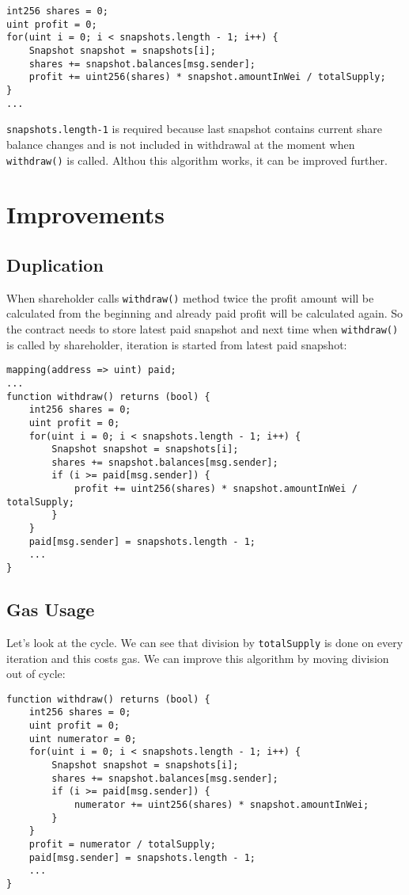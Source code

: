 \documentclass[onecolumn]{article}
\begin{document}
\begin{lstlisting}
int256 shares = 0;
uint profit = 0;
for(uint i = 0; i < snapshots.length - 1; i++) {
	Snapshot snapshot = snapshots[i];
	shares += snapshot.balances[msg.sender];
	profit += uint256(shares) * snapshot.amountInWei / totalSupply;
}
...
\end{lstlisting}
\lstinline{snapshots.length-1} is required because last snapshot contains current share balance changes and is not included in withdrawal at the moment when \lstinline{withdraw()} is called.
Althou this algorithm works, it can be improved further.

\section{Improvements}
\subsection{Duplication}
When shareholder calls \lstinline{withdraw()} method twice the profit amount will be calculated from the beginning and already paid profit will be calculated again. So the contract needs to store latest paid snapshot and next time when \lstinline{withdraw()} is called by shareholder, iteration is started from latest paid snapshot:
\begin{lstlisting}
mapping(address => uint) paid;
...
function withdraw() returns (bool) {
	int256 shares = 0;
	uint profit = 0;
	for(uint i = 0; i < snapshots.length - 1; i++) {
		Snapshot snapshot = snapshots[i];
		shares += snapshot.balances[msg.sender];
		if (i >= paid[msg.sender]) {
			profit += uint256(shares) * snapshot.amountInWei / totalSupply;
		}
	}
	paid[msg.sender] = snapshots.length - 1;
	...
}
\end{lstlisting}
\subsection{Gas Usage}
Let's look at the cycle. We can see that division by \lstinline{totalSupply} is done on every iteration and this costs gas. We can improve this algorithm by moving division out of cycle:
\begin{lstlisting}
function withdraw() returns (bool) {
	int256 shares = 0;
	uint profit = 0;
	uint numerator = 0;
	for(uint i = 0; i < snapshots.length - 1; i++) {
		Snapshot snapshot = snapshots[i];
		shares += snapshot.balances[msg.sender];
		if (i >= paid[msg.sender]) {
			numerator += uint256(shares) * snapshot.amountInWei;
		}
	}
	profit = numerator / totalSupply;
	paid[msg.sender] = snapshots.length - 1;
	...
}
\end{lstlisting}
\end{document}
